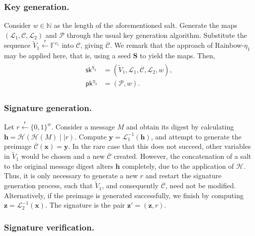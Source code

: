 \documentclass[english]{ufsc-thesis-rn46-2019/ufsc-thesis-rn46-2019}
\newcommand{\random}{\overset{\mathsf{r}}{\gets}}
\theoremstyle{definition}
\begin{document}
\subsubsection{Key generation.}

Consider $w \in \mathbb{N}$ as the length of the aforementioned salt. Generate
the maps $(\mathcal{L}_{1}, \mathcal{C}, \mathcal{L}_{2})$ and $\mathcal{P}$
through the usual key generation algorithm. Substitute the sequence
$\widetilde{V}_{1} \random \mathbb{F}^{v_{1}}$ into $\mathcal{C}$, giving
$\overline{\mathcal{C}}$. We remark that the approach of Rainbow-$\eta_{1}$ may
be applied here, that is, using a seed $\mathbf{S}$ to yield the maps. Then,
\begin{align}
  \begin{split}
    \mathsf{sk}^{\eta_{3}}
      &= (\widetilde{V}_{1}, \mathcal{L}_{1}, \overline{\mathcal{C}},
        \mathcal{L}_{2}, w), \\
    \mathsf{pk}^{\eta_{3}}
      &= (\mathcal{P}, w).
  \end{split}
\end{align}

\subsubsection{Signature generation.}

Let $r \random {\{0, 1\}}^{w}$. Consider a message $M$ and obtain its digest by
calculating $\mathbf{h} = \mathcal{H}(\mathcal{H}(M) \mid\mid r)$. Compute
$\mathbf{y} = \mathcal{L}_{1}^{-1}(\mathbf{h})$, and attempt to generate the
preimage $\overline{\mathcal{C}}(\mathbf{x}) = \mathbf{y}$. In the rare case
that this does not succeed, other variables in $\widetilde{V}_{1}$ would be
chosen and a new $\overline{\mathcal{C}}$ created. However, the concatenation
of a salt to the original message digest alters $\mathbf{h}$ completely, due to
the application of $\mathcal{H}$. Thus, it is only necessary to generate a new
$r$ and restart the signature generation process, such that
$\widetilde{V}_{1}$, and consequently $\overline{\mathcal{C}}$, need not be
modified. Alternatively, if the preimage is generated successfully, we finish
by computing $\mathbf{z} = \mathcal{L}_{2}^{-1}(\mathbf{x})$. The signature is
the pair $\mathbf{z'} = (\mathbf{z}, r)$.

\subsubsection{Signature verification.}
\end{document}
